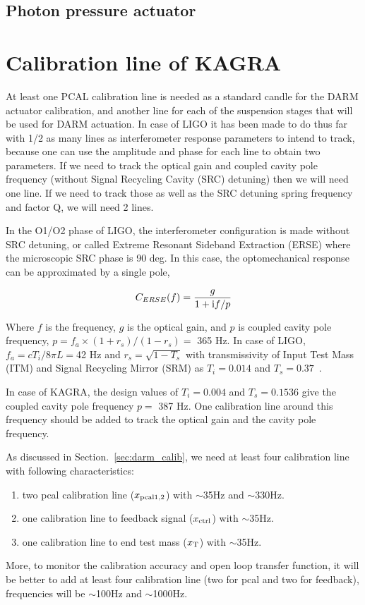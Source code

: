\subsection{Photon pressure actuator}


\section{Calibration line of KAGRA}
At least one PCAL calibration line is needed as a standard candle 
for the DARM actuator calibration, and 
another line for each of the suspension stages that will be used for DARM 
actuation. In case of LIGO it has been made to do thus far with 1/2 
as many lines as interferometer response parameters to intend to track, 
because one can use the amplitude and phase for each line to obtain two 
parameters. If we need to track the optical gain and coupled cavity pole 
frequency (without Signal Recycling Cavity (SRC) detuning) then we will 
need one line. If we need to track those as well as the SRC detuning spring 
frequency and factor Q, we will need 2 lines.

In the O1/O2 phase of LIGO, the interferometer configuration is made without 
SRC detuning, or called Extreme Resonant Sideband Extraction (ERSE) 
where the microscopic SRC phase is 90 deg.
In this case, the optomechanical response can be approximated by a single pole,

\begin{equation}
C_{ERSE}(f) = \frac{g}{1+{\rm i}f/p}
\end{equation}

Where $f$ is the frequency, $g$ is the optical gain, and $p$ is coupled 
cavity pole frequency, $p=f_a\times(1+r_s)/(1-r_s) =$ 365 Hz.
In case of LIGO, $f_a=cT_i/8\pi L = $42 Hz and $r_s=\sqrt{1-T_s}$ 
with transmissivity of Input Test Mass (ITM) and Signal Recycling Mirror (SRM) 
as $T_i=0.014$ and $T_s=0.37$~\cite{OptSpringCal}.

In case of KAGRA, the design values of $T_i=0.004$ and $T_s=0.1536$ give 
the coupled cavity pole frequency $p=$ 387 Hz. One calibration line around 
this frequency should be added to track the optical gain and the cavity pole 
frequency.

As discussed in Section.~\ref{sec:darm_calib}, we need at least four calibration line with following characteristics:
\begin{enumerate}
\item two pcal calibration line ($x_{\rm pcal1,2}$) with $\sim$35Hz and $\sim$330Hz. 
\item one calibration line to feedback signal ($x_{\rm ctrl}$) with $\sim$35Hz.
\item one calibration line to end test mass ($x_{\rm T}$) with $\sim$35Hz.
\end{enumerate}
More, to monitor the calibration accuracy and open loop transfer function,
it will be better to add at least four calibration line (two for pcal and two for feedback), 
frequencies will be $\sim$100Hz and $\sim$1000Hz.


